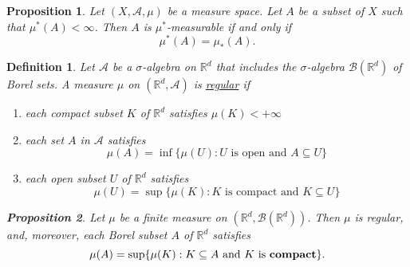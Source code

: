 \documentclass[12pt]{article}
\newtheorem{definition}{Definition}[section]
\newtheorem{proposition}{Proposition}[section]
\begin{document}
\begin{proposition}
	Let $(X, \mathcal{A}, \mu)$ be a measure space. Let $A$ be a subset of $X$ such that $\mu^*(A) < \infty$. Then $A$ is $\mu^*$-measurable if and only if
	$$\mu^*(A) = \mu_*(A).$$
\end{proposition}
\begin{definition}
	Let $\mathcal{A}$ be a $\sigma$-algebra on $\mathbb{R}^d$ that includes the $\sigma$-algebra $\mathcal{B}\left(\mathbb{R}^d\right)$ of Borel sets. A measure $\mu$ on $\left(\mathbb{R}^d, \mathcal{A}\right)$ is \underline{regular} if
	\begin{enumerate}
		\item each compact subset $K$ of $\mathbb{R}^d$ satisfies $\mu(K)<+\infty$
		\item each set $A$ in $\mathcal{A}$ satisfies
		      $$
		      \mu(A)=\inf \{\mu(U): U \text { is open and } A \subseteq U\}$$
		\item each open subset $U$ of $\mathbb{R}^d$ satisfies
		      $$
		      \mu(U)=\sup \{\mu(K): K \text { is compact and } K \subseteq U\}
		      $$
		      
	\end{enumerate}
	
	\begin{proposition}
		Let $\mu$ be a finite measure on $\left(\mathbb{R}^d, \mathcal{B}\left(\mathbb{R}^d\right)\right)$. Then $\mu$ is regular, and, moreover, each Borel subset $A$ of $\mathbb{R}^d$ satisfies
		$$
		\mu(A)=\sup \{\mu(K): K \subseteq A \text { and } K \text { is \textbf{compact}}\} .
		$$
	\end{proposition}
	
	
\end{definition}
\end{document}
